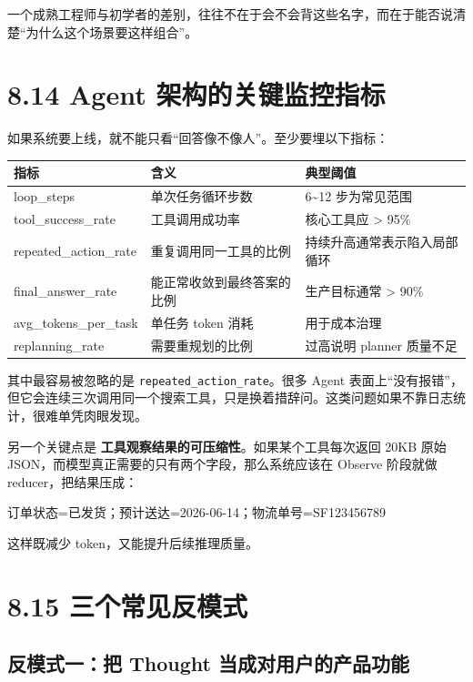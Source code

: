 一个成熟工程师与初学者的差别，往往不在于会不会背这些名字，而在于能否说清楚``为什么这个场景要这样组合''。


\section{8.14 Agent 架构的关键监控指标}

如果系统要上线，就不能只看``回答像不像人''。至少要埋以下指标：


\begingroup
\scriptsize
\setlength{\tabcolsep}{3pt}
\begin{longtable}{|p{}|p{}|p{}|}
\hline
指标 & 含义 & 典型阈值 \\ \hline
loop\_steps & 单次任务循环步数 & 6\textasciitilde{}12 步为常见范围 \\ \hline
tool\_success\_rate & 工具调用成功率 & 核心工具应 > 95\% \\ \hline
repeated\_action\_rate & 重复调用同一工具的比例 & 持续升高通常表示陷入局部循环 \\ \hline
final\_answer\_rate & 能正常收敛到最终答案的比例 & 生产目标通常 > 90\% \\ \hline
avg\_tokens\_per\_task & 单任务 token 消耗 & 用于成本治理 \\ \hline
replanning\_rate & 需要重规划的比例 & 过高说明 planner 质量不足 \\ \hline
\end{longtable}
\endgroup

其中最容易被忽略的是 \texttt{repeated\_action\_rate}。很多 Agent 表面上``没有报错''，但它会连续三次调用同一个搜索工具，只是换着措辞问。这类问题如果不靠日志统计，很难单凭肉眼发现。


另一个关键点是 \textbf{工具观察结果的可压缩性}。如果某个工具每次返回 20KB 原始 JSON，而模型真正需要的只有两个字段，那么系统应该在 Observe 阶段就做 reducer，把结果压成：


\begin{codeblock}
订单状态=已发货；预计送达=2026-06-14；物流单号=SF123456789
\end{codeblock}

这样既减少 token，又能提升后续推理质量。


\section{8.15 三个常见反模式}

\subsection{反模式一：把 Thought 当成对用户的产品功能}

